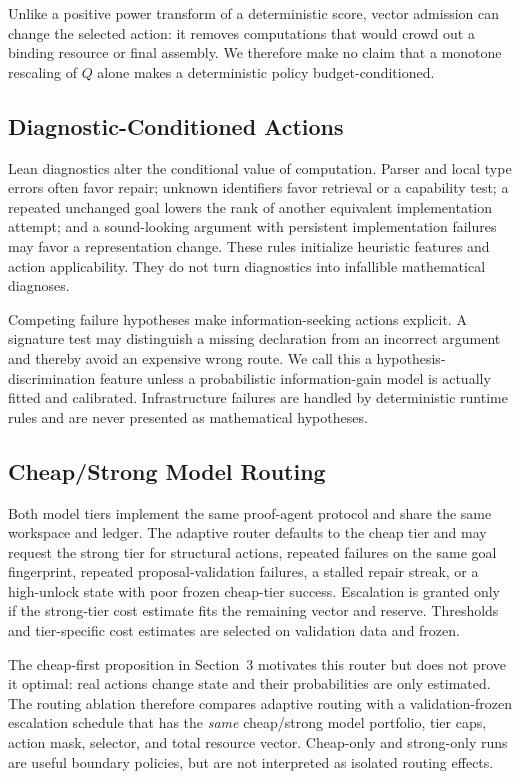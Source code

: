Unlike a positive power transform of a deterministic score, vector admission
can change the selected action: it removes computations that would crowd out a
binding resource or final assembly. We therefore make no claim that a monotone
rescaling of \(Q\) alone makes a deterministic policy budget-conditioned.

\subsection{Diagnostic-Conditioned Actions}

Lean diagnostics alter the conditional value of computation. Parser and local
type errors often favor repair; unknown identifiers favor retrieval or a
capability test; a repeated unchanged goal lowers the rank of another
equivalent implementation attempt; and a sound-looking argument with
persistent implementation failures may favor a representation change. These
rules initialize heuristic features and action applicability. They do not turn
diagnostics into infallible mathematical diagnoses.

Competing failure hypotheses make information-seeking actions explicit. A
signature test may distinguish a missing declaration from an incorrect
argument and thereby avoid an expensive wrong route. We call this a
hypothesis-discrimination feature unless a probabilistic information-gain
model is actually fitted and calibrated. Infrastructure failures are handled
by deterministic runtime rules and are never presented as mathematical
hypotheses.

\subsection{Cheap/Strong Model Routing}

Both model tiers implement the same proof-agent protocol and share the same
workspace and ledger. The adaptive router defaults to the cheap tier and may
request the strong tier for structural actions, repeated failures on the same
goal fingerprint, repeated proposal-validation failures, a stalled repair
streak, or a high-unlock state with poor frozen cheap-tier success. Escalation
is granted only if the strong-tier cost estimate fits the remaining vector and
reserve. Thresholds and tier-specific cost estimates are selected on validation
data and frozen.

The cheap-first proposition in Section~3 motivates this router but does not
prove it optimal: real actions change state and their probabilities are only
estimated. The routing ablation therefore compares adaptive routing with a
validation-frozen escalation schedule that has the \emph{same} cheap/strong
model portfolio, tier caps, action mask, selector, and total resource vector.
Cheap-only and strong-only runs are useful boundary policies, but are not
interpreted as isolated routing effects.


